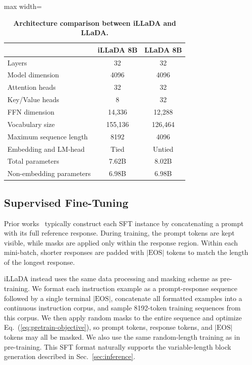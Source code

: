 \documentclass{llmxive}
\begin{document}
\begin{table}[t!]
    \centering
    \vspace{.2cm}
    \begin{adjustbox}{max width=\textwidth}
    \begin{tabular}{lcc}
      \toprule
        & iLLaDA 8B & LLaDA 8B \\
      \midrule
      Layers & 32 & 32 \\
      Model dimension & 4096 & 4096 \\
      Attention heads & 32 & 32 \\
      Key/Value heads & 8 & 32 \\
      FFN dimension & 14,336 & 12,288 \\
      Vocabulary size & 155,136 & 126,464 \\
      Maximum sequence length & 8192 & 4096 \\
      Embedding and LM-head & Tied & Untied \\
      Total parameters & 7.62B & 8.02B \\
      Non-embedding parameters & 6.98B & 6.98B \\
      \bottomrule
    \end{tabular}
    \end{adjustbox}
    \vspace{-.2cm}
\caption{\textbf{Architecture comparison between iLLaDA and LLaDA.}}
\label{tab:architecture}
\end{table}

\subsection{Supervised Fine-Tuning}
\label{sec:sft}

Prior works~\citep{nie2026large,zhu2025llada,you2025llada} typically construct each SFT instance by concatenating a prompt with its full reference response. During training, the prompt tokens are kept visible, while masks are applied only within the response region. Within each mini-batch, shorter responses are padded with \( |\text{EOS}| \) tokens to match the length of the longest response.


iLLaDA instead uses the same data processing and masking scheme as pre-training. We format each instruction example as a prompt-response sequence followed by a single terminal \( |\text{EOS}| \), concatenate all formatted examples into a continuous instruction corpus, and sample 8192-token training sequences from this corpus. We then apply random masks to the entire sequence and optimize Eq.~(\ref{eq:pretrain-objective}), so prompt tokens, response tokens, and \( |\text{EOS}| \) tokens may all be masked. We also use the same random-length training as in pre-training. This SFT format naturally supports the variable-length block generation described in Sec.~\ref{sec:inference}.
\end{document}
